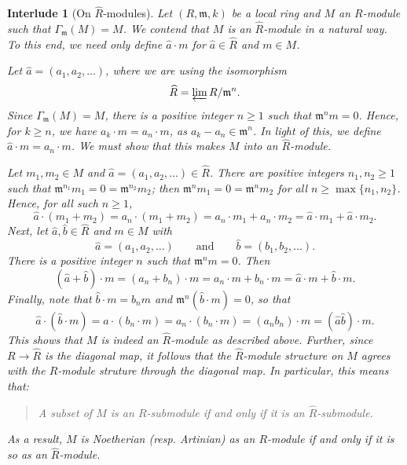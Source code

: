 \documentclass[10pt]{article}
\theoremstyle{thmstyle}
\theoremstyle{defstyle}
\newtheorem{interlude}[theorem]{Interlude}
\newcommand{\frakm}{\mathfrak{m}} %
\newcommand{\wh}[1]{\widehat{#1}}
\renewcommand{\ge}{\geqslant}
\begin{document}
\begin{interlude}[On $\wh R$-modules]
    Let $(R,\frakm, k)$ be a local ring and $M$ an $R$-module such that $\Gamma_\frakm(M) = M$. We contend that $M$ is an $\wh R$-module in a natural way. To this end, we need only define $\wh a\cdot m$ for $\wh a\in\wh R$ and $m\in M$. 

    Let $\wh a = (a_1, a_2, \dots)$, where we are using the isomorphism
    \begin{equation*}
        \wh R = \varprojlim R/\frakm^n.
    \end{equation*}
    Since $\Gamma_\frakm(M) = M$, there is a positive integer $n\ge 1$ such that $\frakm^n m = 0$. Hence, for $k\ge n$, we have $a_k\cdot m = a_n\cdot m$, as $a_k - a_n\in\frakm^n$. In light of this, we define $\wh a\cdot m = a_n\cdot m$. We must show that this makes $M$ into an $\wh R$-module.

    Let $m_1, m_2\in M$ and $\wh a = (a_1, a_2, \dots)\in\wh R$. There are positive integers $n_1, n_2\ge 1$ such that $\frakm^{n_1}m_1 = 0 = \frakm^{n_2} m_2$; then $\frakm^n m_1 = 0 = \frakm^n m_2$ for all $n\ge\max\{n_1, n_2\}$. Hence, for all such $n\ge 1$, 
    \begin{equation*}
        \wh a\cdot(m_1 + m_2) = a_n\cdot (m_1 + m_2) =  a_n\cdot m_1 + a_n\cdot m_2 = \wh a\cdot m_1 + \wh a\cdot m_2.
    \end{equation*}
    Next, let $\wh a,\wh b\in\wh R$ and $m\in M$ with 
    \begin{equation*}
        \wh a = (a_1, a_2, \dots)\qquad\text{and}\qquad\wh b = (b_1, b_2, \dots).
    \end{equation*}
    There is a positive integer $n$ such that $\frakm^n m = 0$. Then 
    \begin{equation*}
        (\wh a + \wh b)\cdot m = (a_n + b_n)\cdot m = a_n\cdot m + b_n\cdot m = \wh a\cdot m + \wh b\cdot m.
    \end{equation*}
    Finally, note that $\wh b\cdot m = b_n m$ and $\frakm^n\left(\wh b\cdot m\right) = 0$, so that 
    \begin{equation*}
        \wh a\cdot\left(\wh b\cdot m\right) = \wh a\cdot\left(b_n\cdot m\right) = a_n\cdot\left(b_n\cdot m\right) = (a_nb_n)\cdot m =(\wh a\wh b)\cdot m.
    \end{equation*}
    This shows that $M$ is indeed an $\wh R$-module as described above. Further, since $R\to \wh R$ is the diagonal map, it follows that the $\wh R$-module structure on $M$ agrees with the $R$-module struture through the diagonal map. In particular, this means that:
    \begin{quotation}
        A subset of $M$ is an $R$-submodule if and only if it is an $\wh R$-submodule.
    \end{quotation}
    As a result, $M$ is Noetherian (resp. Artinian) as an $R$-module if and only if it is so as an $\wh R$-module.

\end{interlude}
\end{document}
